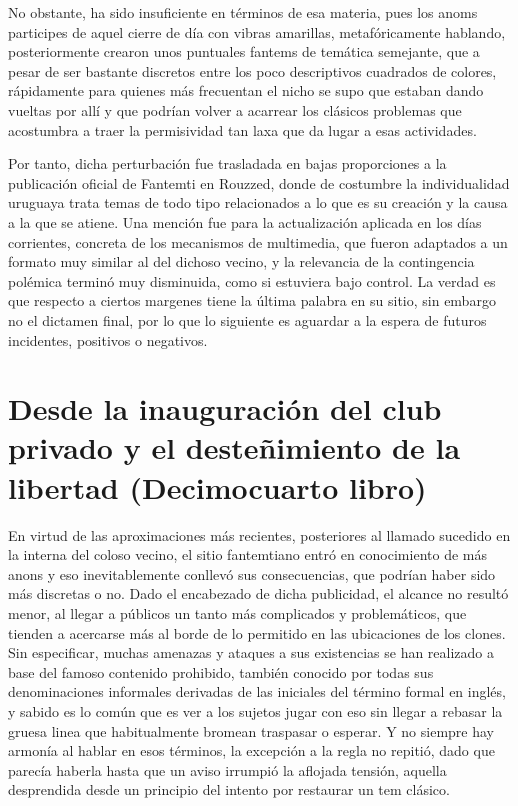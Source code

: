 \documentclass[
]{book}
\begin{document}
No obstante, ha sido insuficiente en términos de esa materia, pues los anoms participes de aquel cierre de día con vibras amarillas, metafóricamente hablando, posteriormente crearon unos puntuales fantems de temática semejante, que a pesar de ser bastante discretos entre los poco descriptivos cuadrados de colores, rápidamente para quienes más frecuentan el nicho se supo que estaban dando vueltas por allí y que podrían volver a acarrear los clásicos problemas que acostumbra a traer la permisividad tan laxa que da lugar a esas actividades.

Por tanto, dicha perturbación fue trasladada en bajas proporciones a la publicación oficial de Fantemti en Rouzzed, donde de costumbre la individualidad uruguaya trata temas de todo tipo relacionados a lo que es su creación y la causa a la que se atiene. Una mención fue para la actualización aplicada en los días corrientes, concreta de los mecanismos de multimedia, que fueron adaptados a un formato muy similar al del dichoso vecino, y la relevancia de la contingencia polémica terminó muy disminuida, como si estuviera bajo control. La verdad es que respecto a ciertos margenes tiene la última palabra en su sitio, sin embargo no el dictamen final, por lo que lo siguiente es aguardar a la espera de futuros incidentes, positivos o negativos.

\hypertarget{desde-la-inauguraciuxf3n-del-club-privado-y-el-desteuxf1imiento-de-la-libertad-decimocuarto-libro}{%
\chapter{Desde la inauguración del club privado y el desteñimiento de la libertad (Decimocuarto libro)}\label{desde-la-inauguraciuxf3n-del-club-privado-y-el-desteuxf1imiento-de-la-libertad-decimocuarto-libro}}

En virtud de las aproximaciones más recientes, posteriores al llamado sucedido en la interna del coloso vecino, el sitio fantemtiano entró en conocimiento de más anons y eso inevitablemente conllevó sus consecuencias, que podrían haber sido más discretas o no. Dado el encabezado de dicha publicidad, el alcance no resultó menor, al llegar a públicos un tanto más complicados y problemáticos, que tienden a acercarse más al borde de lo permitido en las ubicaciones de los clones. Sin especificar, muchas amenazas y ataques a sus existencias se han realizado a base del famoso contenido prohibido, también conocido por todas sus denominaciones informales derivadas de las iniciales del término formal en inglés, y sabido es lo común que es ver a los sujetos jugar con eso sin llegar a rebasar la gruesa linea que habitualmente bromean traspasar o esperar. Y no siempre hay armonía al hablar en esos términos, la excepción a la regla no repitió, dado que parecía haberla hasta que un aviso irrumpió la aflojada tensión, aquella desprendida desde un principio del intento por restaurar un tem clásico.
\end{document}
